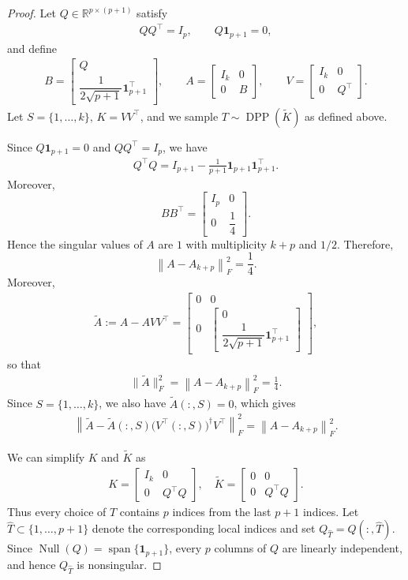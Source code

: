 \documentclass[10pt,a4paper]{amsart}
\newcommand{\be}{\begin{eqnarray}}
\newcommand{\ee}{\end{eqnarray}}
\begin{document}
\begin{proof}
Let $Q\in\mathbb{R}^{p\times(p+1)}$ satisfy
\be
QQ^\top=I_p,
\qquad
Q\mathbf{1}_{p+1}=0,
\ee
and define
\be
B=
\begin{bmatrix}
Q\\[1mm]
\dfrac{1}{2\sqrt{p+1}}\mathbf{1}_{p+1}^\top
\end{bmatrix},
\qquad
A=
\begin{bmatrix}
I_k & 0\\
0 & B
\end{bmatrix},
\qquad
V=
\begin{bmatrix}
I_k & 0\\
0 & Q^\top
\end{bmatrix}.
\ee
Let $S=\{1,\ldots,k\},
\,
K=VV^\top$,
and we sample
$T\sim\operatorname{DPP}(\widetilde K)$ as defined above.

Since $Q\mathbf{1}_{p+1}=0$ and $QQ^\top=I_p$, we have
\be
Q^\top Q
=
I_{p+1}
-
\frac{1}{p+1}
\mathbf{1}_{p+1}\mathbf{1}_{p+1}^\top.
\ee
Moreover,
\[
BB^\top
=
\begin{bmatrix}
I_p & 0\\
0 & \dfrac14
\end{bmatrix}.
\]
Hence the singular values of $A$ are $1$ with multiplicity $k+p$ and $1/2$. Therefore,
\[
\left\|A-A_{k+p}\right\|_F^2=\frac14.
\]
Moreover,
\be
\widetilde A
:=
A-AVV^\top
=
\begin{bmatrix}
0 & 0\\
0 &
\begin{bmatrix}
0\\
\dfrac{1}{2\sqrt{p+1}}\mathbf{1}_{p+1}^\top
\end{bmatrix}
\end{bmatrix},
\ee
so that
\be
\|\widetilde A\|_F^2
=
\left\|
A-A_{k+p}
\right\|_F^2= \frac14.
\ee
Since $S=\{1,\ldots,k\}$, we also have
$\widetilde A(:,S)=0$,
which gives
\be
\left\|
\widetilde A
-
\widetilde A(:,S)
\bigl(V^\top(:,S)\bigr)^\dagger
V^\top
\right\|_F^2
=
\left\|
A-A_{k+p}
\right\|_F^2.
\ee

We can simplify $K$ and $\widetilde K$ as
\be
K=
\begin{bmatrix}
I_k & 0\\
0 & Q^\top Q
\end{bmatrix},
\quad
\widetilde K
=
\begin{bmatrix}
0 & 0\\
0 & Q^\top Q
\end{bmatrix}.
\ee
Thus every choice of $T$ contains $p$ indices from the last
$p+1$ indices. Let $\widehat T\subset\{1,\ldots,p+1\}$ denote the
corresponding local indices and set
$
Q_{\widehat T}=Q(:,\widehat T).
$
Since $\operatorname{Null}(Q)=\operatorname{span}
\{\mathbf{1}_{p+1}\}$, every $p$ columns of $Q$ are linearly
independent, and hence $Q_{\widehat T}$ is nonsingular.


\end{proof}
\end{document}
